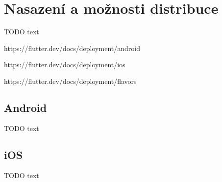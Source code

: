 \chapter{Nasazení a možnosti distribuce}

TODO text

https://flutter.dev/docs/deployment/android

https://flutter.dev/docs/deployment/ios

https://flutter.dev/docs/deployment/flavors

\section{Android}

TODO text

\section{iOS}

TODO text
